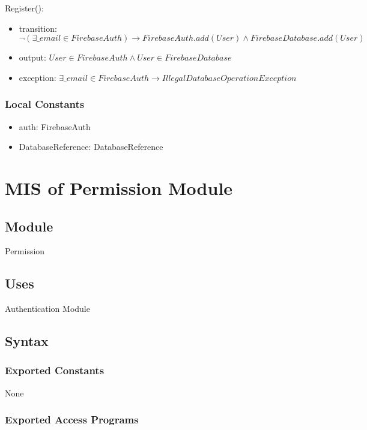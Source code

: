 \documentclass[12pt, titlepage]{article}
\begin{document}
\noindent Register():
\begin{itemize}
\item transition: $\lnot(\exists \_email \in FirebaseAuth) \rightarrow FirebaseAuth.add(User) \land FirebaseDatabase.add(User)$ 
\item output: $User \in FirebaseAuth \land User \in FirebaseDatabase$
\item exception: $\exists \_email \in FirebaseAuth \rightarrow IllegalDatabaseOperationException$
\end{itemize}

\subsubsection{Local Constants}

\begin{itemize}
  \item auth: FirebaseAuth
  \item DatabaseReference: DatabaseReference
\end{itemize}

\newpage

\section{MIS of Permission Module} \label{mPerm}

\subsection{Module}

Permission

\subsection{Uses}

Authentication Module

\subsection{Syntax}

\subsubsection{Exported Constants}

None

\subsubsection{Exported Access Programs}
\end{document}

